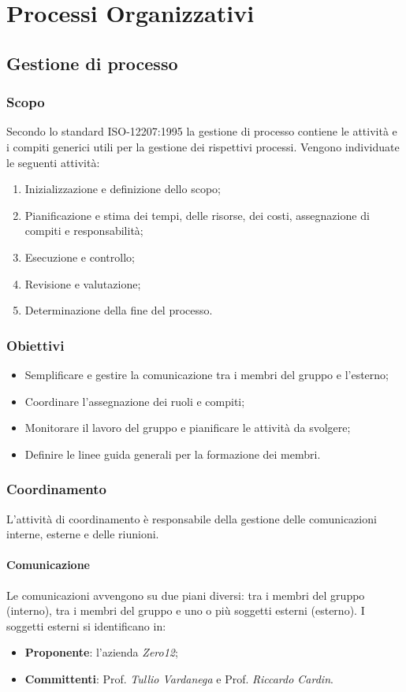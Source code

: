  \section{Processi Organizzativi}

\subsection{Gestione di processo}

\subsubsection{Scopo}
Secondo lo standard ISO-12207:1995 la gestione di processo contiene le attività e i compiti generici utili per la gestione dei rispettivi processi. Vengono individuate le seguenti attività:
\begin{enumerate}
\item Inizializzazione e definizione dello scopo;
\item Pianificazione e stima dei tempi, delle risorse, dei costi, assegnazione di compiti e responsabilità;
\item Esecuzione e controllo;
\item Revisione e valutazione;
\item Determinazione della fine del processo.
\end{enumerate}

\subsubsection{Obiettivi}
\begin{itemize}
\item Semplificare e gestire la comunicazione tra i membri del gruppo e l'esterno;
\item Coordinare l'assegnazione dei ruoli e compiti;
\item Monitorare il lavoro del gruppo e pianificare le attività da svolgere;
\item Definire le linee guida generali per la formazione dei membri.
\end{itemize}

\subsubsection{Coordinamento}
L'attività di coordinamento è responsabile della gestione delle comunicazioni interne, esterne e delle riunioni.


\paragraph{Comunicazione}
Le comunicazioni avvengono su due piani diversi: tra i membri del gruppo (interno), tra i membri del gruppo e uno o più soggetti esterni (esterno). I soggetti esterni si identificano in:
\begin{itemize}
\item \textbf{Proponente}: l'azienda \textit{Zero12};
\item \textbf{Committenti}:  Prof. \textit{Tullio Vardanega} e Prof. \textit{Riccardo Cardin}.
\end{itemize}

